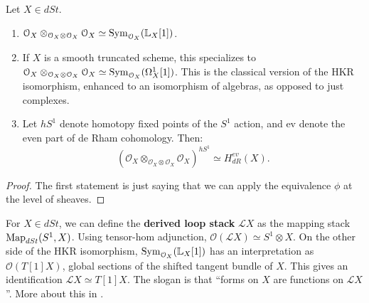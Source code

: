 \begin{cor}
\label{cor:HKR}
Let $X \in dSt$. 
\begin{enumerate}
\item $\mathcal{O}_X \otimes_{\mathcal{O}_X\otimes\mathcal{O}_X} \mathcal{O}_X \simeq \operatorname{Sym}_{\mathcal{O}_X} (\mathbb L_X[1])$.
\item If $X$ is a smooth truncated scheme, this specializes to $\mathcal{O}_X \otimes_{\mathcal{O}_X\otimes\mathcal{O}_X} 
\mathcal{O}_X \simeq \operatorname{Sym}_{\mathcal{O}_X} (\Omega^1_X[1])$. This is the classical version of the HKR isomorphism, enhanced
to an isomorphism of algebras, as opposed to just complexes.
\item Let $hS^1$ denote homotopy fixed points of the $S^1$ action, and ev denote the even part of de Rham cohomology. Then:
\[	(\mathcal{O}_X \otimes_{\mathcal{O}_X\otimes\mathcal{O}_X} \mathcal{O}_X)^{hS^1} \simeq H_{dR}^{ev}(X).	\]
\end{enumerate}
\end{cor}
\begin{proof}
The first statement is just saying that we can apply the equivalence $\phi$ at the level of sheaves.
\end{proof}

\begin{rem}
\label{rem:loop_stack}
For $X \in dSt$, we can define the \textbf{derived loop stack} $\mathscr{L}X$ as the mapping stack $\operatorname{Map}_{dSt}(S^1,X)$.
Using tensor-hom adjunction, $\mathcal{O}(\mathscr{L}X) \simeq S^1 \otimes X$. On the other side of the HKR
isomorphism, $\operatorname{Sym}_{\mathcal{O}_X} (\mathbb L_X[1])$ has an interpretation as $\mathcal{O}(T[1]X)$, global sections of the
shifted tangent bundle of $X$. This gives an identification $\mathscr{L}X \simeq T[1]X$. 
The slogan is that ``forms on $X$ are functions on $\mathcal{L}X$''. More about this in \cite{BZN_loop}.
\end{rem}


